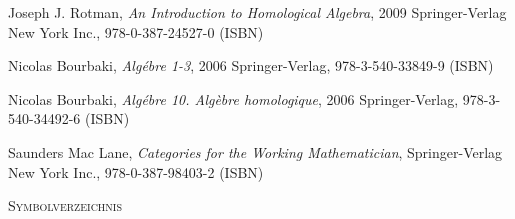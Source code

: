 \documentclass[a4paper]{amsart}
\theoremstyle{definition}
\begin{document}
\begin{thebibliography}{9}
   	Joseph J. Rotman, \emph{An Introduction to Homological Algebra},
   	2009 Springer-Verlag New York Inc., 978-0-387-24527-0 (ISBN)

      Nicolas Bourbaki, \emph{Algébre 1-3},
      2006 Springer-Verlag, 978-3-540-33849-9 (ISBN)

      Nicolas Bourbaki, \emph{Algébre 10. Algèbre homologique},
      2006 Springer-Verlag, 978-3-540-34492-6 (ISBN)

      Saunders Mac Lane, \emph{Categories for the Working Mathematician},
      Springer-Verlag New York Inc., 978-0-387-98403-2 (ISBN)

\end{thebibliography}

\begin{large}
    \centerline{\textsc{Symbolverzeichnis}}
\end{large}
\bigskip

\renewcommand*{\arraystretch}{1}
\end{document}
